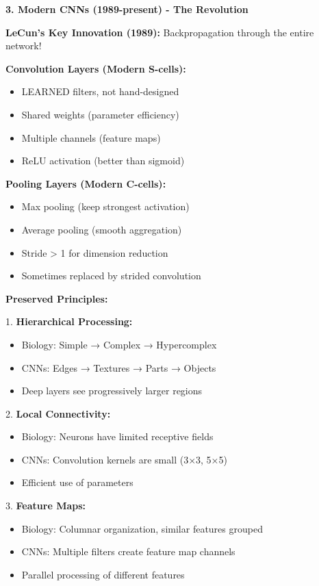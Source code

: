 \documentclass[12pt]{article}
\newcommand{\explanation}[1]{{\color{explanationcolor}#1}}
\begin{document}
\begin{enumerate}[(a)]
{    \textbf{3. Modern CNNs (1989-present) - The Revolution}
    
    \explanation{
    \textbf{LeCun's Key Innovation (1989):}
    Backpropagation through the entire network!
    
    \textbf{Convolution Layers (Modern S-cells):}
    \begin{itemize}
        \item LEARNED filters, not hand-designed
        \item Shared weights (parameter efficiency)
        \item Multiple channels (feature maps)
        \item ReLU activation (better than sigmoid)
    \end{itemize}
    
    \textbf{Pooling Layers (Modern C-cells):}
    \begin{itemize}
        \item Max pooling (keep strongest activation)
        \item Average pooling (smooth aggregation)
        \item Stride > 1 for dimension reduction
        \item Sometimes replaced by strided convolution
    \end{itemize}
    }
    
    \textbf{Preserved Principles:}
    
    \explanation{
    1. \textbf{Hierarchical Processing:}
    \begin{itemize}
        \item Biology: Simple → Complex → Hypercomplex
        \item CNNs: Edges → Textures → Parts → Objects
        \item Deep layers see progressively larger regions
    \end{itemize}
    
    2. \textbf{Local Connectivity:}
    \begin{itemize}
        \item Biology: Neurons have limited receptive fields
        \item CNNs: Convolution kernels are small (3×3, 5×5)
        \item Efficient use of parameters
    \end{itemize}
    
    3. \textbf{Feature Maps:}
    \begin{itemize}
        \item Biology: Columnar organization, similar features grouped
        \item CNNs: Multiple filters create feature map channels
        \item Parallel processing of different features
    \end{itemize}
    
}}
\end{enumerate}
\end{document}
